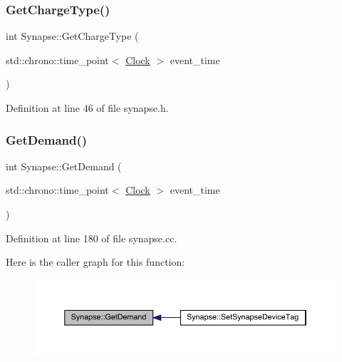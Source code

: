 \subsubsection{\texorpdfstring{Get\+Charge\+Type()}{GetChargeType()}}
{\footnotesize\ttfamily int Synapse\+::\+Get\+Charge\+Type (\begin{DoxyParamCaption}\item[{std\+::chrono\+::time\+\_\+point$<$ \hyperlink{universe_8h_a0ef8d951d1ca5ab3cfaf7ab4c7a6fd80}{Clock} $>$}]{event\+\_\+time }\end{DoxyParamCaption})\hspace{0.3cm}{\ttfamily [inline]}}



Definition at line 46 of file synapse.\+h.

\mbox{\label{class_synapse_a6d4d63e445961c62f71eaf0da1c2848b}} 
\subsubsection{\texorpdfstring{Get\+Demand()}{GetDemand()}}
{\footnotesize\ttfamily int Synapse\+::\+Get\+Demand (\begin{DoxyParamCaption}\item[{std\+::chrono\+::time\+\_\+point$<$ \hyperlink{universe_8h_a0ef8d951d1ca5ab3cfaf7ab4c7a6fd80}{Clock} $>$}]{event\+\_\+time }\end{DoxyParamCaption})}



Definition at line 180 of file synapse.\+cc.

Here is the caller graph for this function\+:\nopagebreak
\begin{figure}[H]
\begin{center}
\leavevmode
\includegraphics[width=350pt]{class_synapse_a6d4d63e445961c62f71eaf0da1c2848b_icgraph}
\end{center}
\end{figure}
\mbox{\label{class_synapse_a314047a6f724abee8c73a16c68f3a8c2}} 

